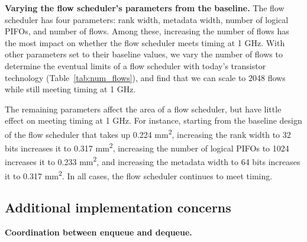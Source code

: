 \medskip
\noindent
\textbf{Varying the flow scheduler's parameters from the baseline.}
The flow scheduler has four parameters: rank width, metadata width, number of
logical PIFOs, and number of flows. Among these, increasing the number of flows
has the most impact on whether the flow scheduler meets timing at 1 GHz.   With other parameters set to their baseline values, we vary the number
of flows to determine the eventual limits of a flow scheduler with today's
transistor technology (Table~\ref{tab:num_flows}), and find that we can scale
to 2048 flows while still meeting timing at 1 GHz.

The remaining parameters affect the area of a flow scheduler, but have
little effect on meeting timing at 1 GHz. For instance, starting from
the baseline design of the flow scheduler that takes up 0.224
\si{\milli\metre\squared}, increasing the rank width to 32 bits increases it
 to 0.317 \si{\milli\metre\squared}, increasing the number of logical
PIFOs to 1024 increases it to 0.233 \si{\milli\metre\squared}, and
increasing the metadata width to 64 bits increases it to 0.317
\si{\milli\metre\squared}. In all cases, the flow scheduler continues to meet timing.


\subsection{Additional implementation concerns}
\label{ss:add_impl}

\medskip
\noindent
\textbf{Coordination between enqueue and dequeue.}

